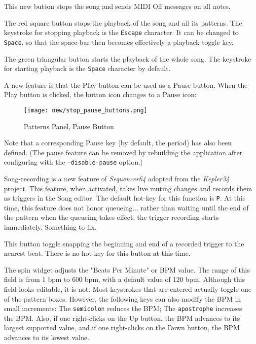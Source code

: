   This new button stops the song and sends MIDI Off messages on all notes.

   The red square button stops the playback of the song and all its patterns.
   The keystroke for stopping playback is the \texttt{Escape} character.
   It can be changed to \texttt{Space}, so that the space-bar then becomes
   effectively a playback toggle key.

   The green triangular button starts the playback of the whole song.
   The keystroke for starting playback is the \texttt{Space} character by
   default.

   A new feature is that the Play button can be used as a Pause button.
   When the Play button is clicked, the button icon changes to a Pause icon:

\begin{figure}[H]
   \centering 
   \texttt{[image: new/stop\_pause\_buttons.png]}
   \caption{Patterns Panel, Pause Button}
   \label{fig:pattern_window_pause_button}
\end{figure}

   Note that a corresponding Pause key (by default, the period) has also been
   defined.  (The pause feature can be removed by rebuilding the application
   after configuring with the \texttt{--disable-pause} option.)

   Song-recording is a new feature of \textsl{Sequencer64} adopted from the
   \textsl{Kepler34} project.
   This feature, when activated, takes live muting changes and records them as
   triggers in the Song editor.
   The default hot-key for this function is \texttt{P}.
   At this time, this feature does not honor queueing...
   rather than waiting until the end of the pattern when the queueing takes
   effect, the trigger recording starts immediately.  Something to fix.

   This button toggle snapping the beginning and end of a recorded trigger to
   the nearest beat.  There is no hot-key for this button at this time.

   The spin widget adjusts the "Beats Per Minute" or BPM value.  The
   range of this field is from 1 bpm to 600 bpm, with a default value of
   120 bpm.
   Although this field looks editable, it is not.  Most keystrokes
   that are entered actually toggle one of the pattern boxes.
   However, the following keys can also modify the BPM in small increments:
   The \texttt{semicolon} reduces the BPM;
   The \texttt{apostrophe} increases the BPM.
   Also, if one right-clicks on the Up button, the BPM advances to its largest
   supported value, and if one right-clicks on the Down button, the BPM
   advances to its lowest value.

